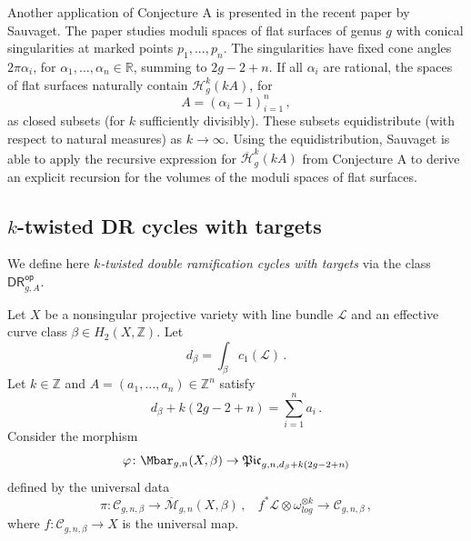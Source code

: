 \documentclass[a4paper,12pt]{article} %
\newcommand{\ca}[1]{{\mathcal{#1}}}
\def\cM{{\mathcal{M}}}
\def\HH{\mathcal{H}}
\theoremstyle{definition}
\theoremstyle{plain}%
\newcommand{\MbarX}{\Mbar_{g,n}(X, \beta)}
\renewcommand{\phi}{\varphi}
\newcommand{\Picabs}{\mathfrak{Pic}}
\newcommand{\DRop}{\mathsf{DR}^{\mathsf{op}}}
\begin{document}
Another application of Conjecture A is presented in the recent paper \cite{sauvaget_volumes} by Sauvaget. The paper studies moduli spaces of flat surfaces of genus $g$ with conical singularities at marked points $p_1, ..., p_n$. The singularities have fixed cone angles $2 \pi \alpha_i$, for $\alpha_1, \ldots, \alpha_n \in \mathbb{R}$, summing to $2g-2+n$. 
If all $\alpha_i$ are rational,  
the spaces of flat surfaces naturally contain $\mathcal{H}_g^k(k A )$,
for  $$A=(\alpha_i-1)_{i=1}^n\, ,$$
as closed subsets (for $k$ sufficiently divisibly). These subsets equidistribute (with respect to natural measures) as $k \to \infty$. Using the
equidistribution, 
Sauvaget is able to apply the recursive expression for $\overline{\HH}_g^k(k A)$ from Conjecture A to derive an explicit recursion for the volumes of the moduli spaces of flat surfaces.

\subsection{\texorpdfstring{$k$}{k}-twisted DR cycles with targets} \label{Sect:ktwistedDR}
We define  here  {\em $k$-twisted double ramification cycles with targets} via the class $\DRop_{g,A}$.

Let $X$ be a nonsingular projective variety with line bundle $\ca L$ and
an effective curve class
$\beta \in H_2(X, \mathbb{Z})$. Let
$$d_\beta= \int_\beta c_1(\ca L)\, .$$
Let $k\in \mathbb{Z}$ and $A=(a_1,\ldots, a_n)\in \mathbb{Z}^n$ satisfy
\begin{equation*}
d_\beta + k(2g-2+n) = \sum_{i=1}^{n}a_i\, .
\end{equation*}
Consider the morphism
\[
\phi\colon \MbarX \to \Picabs_{g,n,d_\beta+k(2g-2+n)}
\]
defined by the universal data
\begin{equation}\label{fftt666774}
\pi: \mathcal{C}_{g,n,\beta} \rightarrow \overline{\cM}_{g,n}(X,\beta)\, , \ \ \ \ 
f^*\ca L\otimes \omega^{\otimes k}_{log}
\rightarrow \mathcal{C}_{g,n,\beta}\, ,
\end{equation}
where
$f: \mathcal{C}_{g,n,\beta} \to X$
is the universal map.
\end{document}
